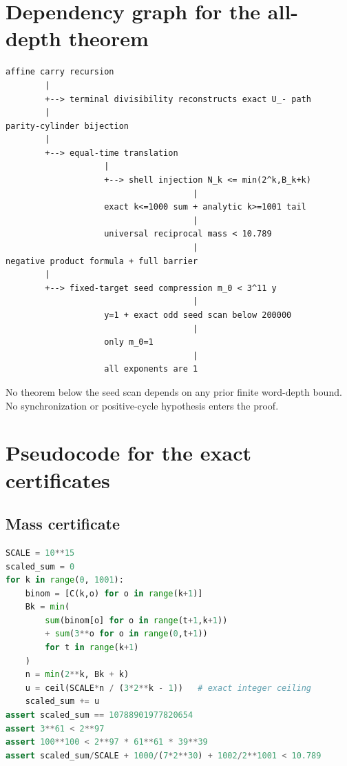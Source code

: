 \documentclass[11pt]{article}
\theoremstyle{definition}
\theoremstyle{remark}
\begin{document}
\appendix

\section{Dependency graph for the all-depth theorem}\label{app:dependency}

\begin{Verbatim}[fontsize=\small,frame=single]
affine carry recursion
        |
        +--> terminal divisibility reconstructs exact U_- path
        |
parity-cylinder bijection
        |
        +--> equal-time translation
                    |
                    +--> shell injection N_k <= min(2^k,B_k+k)
                                      |
                    exact k<=1000 sum + analytic k>=1001 tail
                                      |
                    universal reciprocal mass < 10.789
                                      |
negative product formula + full barrier
        |
        +--> fixed-target seed compression m_0 < 3^11 y
                                      |
                    y=1 + exact odd seed scan below 200000
                                      |
                    only m_0=1
                                      |
                    all exponents are 1
\end{Verbatim}

No theorem below the seed scan depends on any prior finite word-depth bound.
No synchronization or positive-cycle hypothesis enters the proof.

\section{Pseudocode for the exact certificates}\label{app:pseudocode}

\subsection{Mass certificate}

\begin{lstlisting}[language=Python]
SCALE = 10**15
scaled_sum = 0
for k in range(0, 1001):
    binom = [C(k,o) for o in range(k+1)]
    Bk = min(
        sum(binom[o] for o in range(t+1,k+1))
        + sum(3**o for o in range(0,t+1))
        for t in range(k+1)
    )
    n = min(2**k, Bk + k)
    u = ceil(SCALE*n / (3*2**k - 1))   # exact integer ceiling
    scaled_sum += u
assert scaled_sum == 10788901977820654
assert 3**61 < 2**97
assert 100**100 < 2**97 * 61**61 * 39**39
assert scaled_sum/SCALE + 1000/(7*2**30) + 1002/2**1001 < 10.789
\end{lstlisting}
\end{document}
